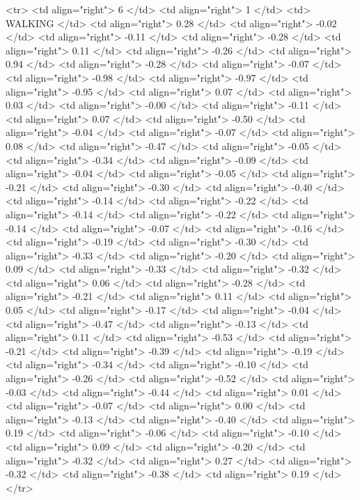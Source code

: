   <tr> <td align="right"> 6 </td> <td align="right">   1 </td> <td> WALKING </td> <td align="right"> 0.28 </td> <td align="right"> -0.02 </td> <td align="right"> -0.11 </td> <td align="right"> -0.28 </td> <td align="right"> 0.11 </td> <td align="right"> -0.26 </td> <td align="right"> 0.94 </td> <td align="right"> -0.28 </td> <td align="right"> -0.07 </td> <td align="right"> -0.98 </td> <td align="right"> -0.97 </td> <td align="right"> -0.95 </td> <td align="right"> 0.07 </td> <td align="right"> 0.03 </td> <td align="right"> -0.00 </td> <td align="right"> -0.11 </td> <td align="right"> 0.07 </td> <td align="right"> -0.50 </td> <td align="right"> -0.04 </td> <td align="right"> -0.07 </td> <td align="right"> 0.08 </td> <td align="right"> -0.47 </td> <td align="right"> -0.05 </td> <td align="right"> -0.34 </td> <td align="right"> -0.09 </td> <td align="right"> -0.04 </td> <td align="right"> -0.05 </td> <td align="right"> -0.21 </td> <td align="right"> -0.30 </td> <td align="right"> -0.40 </td> <td align="right"> -0.14 </td> <td align="right"> -0.22 </td> <td align="right"> -0.14 </td> <td align="right"> -0.22 </td> <td align="right"> -0.14 </td> <td align="right"> -0.07 </td> <td align="right"> -0.16 </td> <td align="right"> -0.19 </td> <td align="right"> -0.30 </td> <td align="right"> -0.33 </td> <td align="right"> -0.20 </td> <td align="right"> 0.09 </td> <td align="right"> -0.33 </td> <td align="right"> -0.32 </td> <td align="right"> 0.06 </td> <td align="right"> -0.28 </td> <td align="right"> -0.21 </td> <td align="right"> 0.11 </td> <td align="right"> 0.05 </td> <td align="right"> -0.17 </td> <td align="right"> -0.04 </td> <td align="right"> -0.47 </td> <td align="right"> -0.13 </td> <td align="right"> 0.11 </td> <td align="right"> -0.53 </td> <td align="right"> -0.21 </td> <td align="right"> -0.39 </td> <td align="right"> -0.19 </td> <td align="right"> -0.34 </td> <td align="right"> -0.10 </td> <td align="right"> -0.26 </td> <td align="right"> -0.52 </td> <td align="right"> -0.03 </td> <td align="right"> -0.44 </td> <td align="right"> 0.01 </td> <td align="right"> -0.07 </td> <td align="right"> 0.00 </td> <td align="right"> -0.13 </td> <td align="right"> -0.40 </td> <td align="right"> 0.19 </td> <td align="right"> -0.06 </td> <td align="right"> -0.10 </td> <td align="right"> 0.09 </td> <td align="right"> -0.20 </td> <td align="right"> -0.32 </td> <td align="right"> 0.27 </td> <td align="right"> -0.32 </td> <td align="right"> -0.38 </td> <td align="right"> 0.19 </td> </tr>
